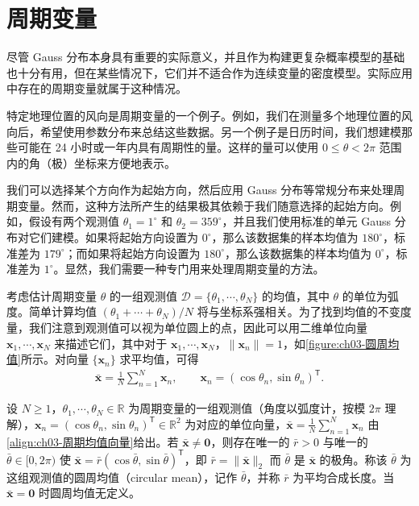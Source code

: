 \documentclass[../../main.tex]{subfiles}
\begin{document}
\section{周期变量}\label{section:ch03-周期变量}

尽管 Gauss 分布本身具有重要的实际意义，并且作为构建更复杂概率模型的基础也十分有用，但在某些情况下，它们并不适合作为连续变量的密度模型。实际应用中存在的周期变量就属于这种情况。

特定地理位置的风向是周期变量的一个例子。例如，我们在测量多个地理位置的风向后，希望使用参数分布来总结这些数据。另一个例子是日历时间，我们想建模那些可能在 24 小时或一年内具有周期性的量。这样的量可以使用 $0\leqslant\theta<2\pi$ 范围内的角（极）坐标来方便地表示。

我们可以选择某个方向作为起始方向，然后应用 Gauss 分布等常规分布来处理周期变量。然而，这种方法所产生的结果极其依赖于我们随意选择的起始方向。例如，假设有两个观测值 $\theta_1=1^{\circ}$ 和 $\theta_2=359^{\circ}$，并且我们使用标准的单元 Gauss 分布对它们建模。如果将起始方向设置为 $0^{\circ}$，那么该数据集的样本均值为 $180^{\circ}$，标准差为 $179^{\circ}$；而如果将起始方向设置为 $180^{\circ}$，那么该数据集的样本均值为 $0^{\circ}$，标准差为 $1^{\circ}$。显然，我们需要一种专门用来处理周期变量的方法。

考虑估计周期变量 $\theta$ 的一组观测值 $\mathcal{D}=\{\theta_1,\cdots,\theta_N\}$ 的均值，其中 $\theta$ 的单位为弧度。简单计算均值 $(\theta_1+\cdots+\theta_N)/N$ 将与坐标系强相关。为了找到均值的不变度量，我们注意到观测值可以视为单位圆上的点，因此可以用二维单位向量 $\boldsymbol{x}_1,\cdots,\boldsymbol{x}_N$ 来描述它们，其中对于 $\boldsymbol{x}_1,\cdots,\boldsymbol{x}_N$，$\lVert\boldsymbol{x}_n\rVert=1$，如\cref{figure:ch03-圆周均值}所示。对向量 $\{\boldsymbol{x}_n\}$ 求平均值，可得
\begin{align}
\bar{\boldsymbol{x}}=\frac{1}{N}\sum_{n=1}^{N}\boldsymbol{x}_n,\qquad \boldsymbol{x}_n=(\cos\theta_n,\sin\theta_n)^{\mathsf{T}}.
\label{align:ch03-周期均值向量}
\end{align}

\begin{definition}[圆周均值]\label{definition:ch03-圆周均值}
设 $N\geqslant1$，$\theta_1,\cdots,\theta_N\in\mathbb{R}$ 为周期变量的一组观测值（角度以弧度计，按模 $2\pi$ 理解），$\boldsymbol{x}_n=(\cos\theta_n,\sin\theta_n)^{\mathsf{T}}\in\mathbb{R}^{2}$ 为对应的单位向量，$\bar{\boldsymbol{x}}=\frac{1}{N}\sum_{n=1}^{N}\boldsymbol{x}_n$ 由\eqref{align:ch03-周期均值向量}给出。若 $\bar{\boldsymbol{x}}\neq\boldsymbol{0}$，则存在唯一的 $\bar{r}>0$ 与唯一的 $\bar{\theta}\in[0,2\pi)$ 使 $\bar{\boldsymbol{x}}=\bar{r}(\cos\bar{\theta},\sin\bar{\theta})^{\mathsf{T}}$，即 $\bar{r}=\lVert\bar{\boldsymbol{x}}\rVert_{2}$ 而 $\bar{\theta}$ 是 $\bar{\boldsymbol{x}}$ 的极角。称该 $\bar{\theta}$ 为这组观测值的圆周均值（circular mean），记作 $\bar{\theta}$，并称 $\bar{r}$ 为平均合成长度。当 $\bar{\boldsymbol{x}}=\boldsymbol{0}$ 时圆周均值无定义。
\end{definition}
\end{document}
